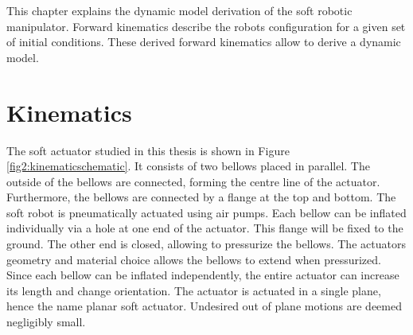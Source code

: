This chapter explains the dynamic model derivation of the soft robotic manipulator. Forward kinematics describe the robots configuration for a given set of initial conditions. These derived forward kinematics allow to derive a dynamic model. 



\section{Kinematics}

The soft actuator studied in this thesis is shown in Figure \ref{fig2:kinematicschematic}. It consists of two bellows placed in parallel. The outside of the bellows are connected, forming the centre line of the actuator. Furthermore, the bellows are connected by a flange at the top and bottom. The soft robot is pneumatically actuated using air pumps. Each bellow can be inflated individually via a hole at one end of the actuator. This flange will be fixed to the ground. The other end is closed, allowing to pressurize the bellows. The actuators geometry and material choice allows the bellows to extend when pressurized. Since each bellow can be inflated independently, the entire actuator can increase its length and change orientation. The actuator is actuated in a single plane, hence the name planar soft actuator. Undesired out of plane motions are deemed negligibly small.

